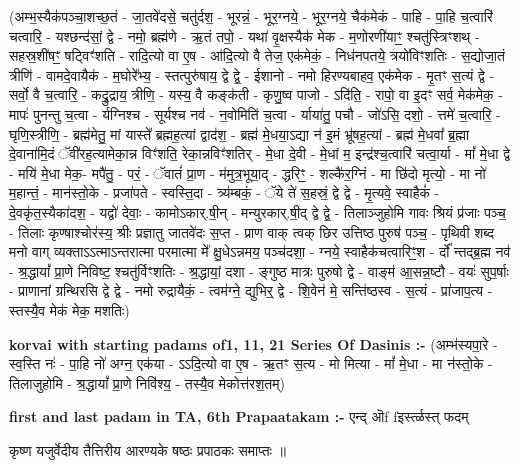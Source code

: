 \documentclass[17pt]{extarticle}
\begin{document}
(अम्भ॒स्यैक॑पञ्चा॒शच्छ॒तं - जा॒तवे॑दसे॒ चतु॑र्दश॒ - भूरन्नं॒ - भूर॒ग्नये॒ - भूर॒ग्नये॒ चैक॑मेकं - पाहि - पा॒हि च॒त्वारि॑ चत्वारि॒ - यश्छन्द॑सां॒ द्वे - नमो॒ ब्रह्म॑णे - ऋ॒तं तपो॒ - यथा॑ वृ॒क्षस्यैक॑ मेक - म॒णोरणी॑याꣳ॒॒ श्चतु॑स्त्रिꣳशथ् - सहस्र॒शी॑षꣳ॒॒ षट्विꣳ॑शति - रादि॒त्यो वा ए॒ष - आ॑दि॒त्यो वै तेज॒ एक॑मेकं॒ - निध॑नपतये॒ त्रयो॑विꣳशतिः - स॒द्योजा॒तं त्रीणि॑ - वामदे॒वायैक॑ - म॒घोरे᳚भ्य॒ - स्तत्पुरु॑षाय॒ द्वे द्वे॒ - ईशानो - नमो हिरण्यबाहव॒ एक॑मेक - मृ॒तꣳ स॒त्यं द्वे - सर्वो॒ वै च॒त्वारि॒ - कद्रु॒द्राय॒ त्रीणि॒ - यस्य॒ वै कङ्क॑ती - कृणु॒ष्व पाजो - ऽदि॑ति॒ - रापो॒ वा इ॒दꣳ सर्व॒ मेक॑मेक॒ - मापः॑ पुनन्तु च॒त्वा - र्यग्निश्च - सूर्यश्च नव॑ - न॒वोमिति॑ च॒त्वा - र्याया॑तु॒ पचौ - जो॑ऽसि॒ दशो॒ - त्तमे॑ च॒त्वारि॒ - घृणि॒स्त्रीणि॒ - ब्रह्म॑मेतु॒ मां यास्ते᳚ ब्रह्मह॒त्यां द्वाद॑श॒ - ब्रह्म॑ मे॒धया॒ऽद्या न॑ इ॒मं भ्रू॑षह॒त्यां - ब्रह्म॑ मे॒धवा᳚ ब्र॒ह्मा दे॒वाना॑मि॒दं ॅवी॑रह॒त्यामेका॒न्न विꣳ॑शति॒ रेका॒न्नविꣳ॑शतिर् - मे॒धा दे॒वी - मे॒धां म॒ इन्द्र॑श्च॒त्वारि॑ चत्वा॒र्या - मां᳚ मे॒धा द्वे - मयि॑ मे॒धा मेक॒- मपै॑तु॒ - परं॒ - ॅवातं॑ प्रा॒ण - म॑मुत्र॒भूया॒द् - द्धरिꣳ॒॒ - शल्कै॑र॒ग्निं - मा छि॑दो मृत्यो॒ - मा नो॑ म॒हान्तं॒ - मान॑स्तो॒के - प्रजा॑पते - स्वस्ति॒दा - त्र्य॑म्बकं॒ - ॅये ते॑ स॒हस्रं॒ द्वे द्वे - मृ॒त्यवे॒ स्वाहैकं॑ - दे॒वकृ॑त॒स्यैका॑दश॒ - यद्वो॑ देवाः॒ - कामोऽकार्.षी॒न् - मन्युरकार्.षी॒द् द्वे द्वे॒ - तिलाञ्जुहोमि गावः श्रियं प्र॑जाः पञ्च॒ - तिलाः कृण्षाश्चोर॑स्य॒ श्रीः प्रज्ञातु जातवे॑दः स॒प्त - प्राण वाक् त्वक् छिर उत्तिष्ठ पुरुष॑ पञ्च॒ - पृथिवी शब्द मनो वाग् व्यक्ताऽऽत्माऽन्तरात्मा परमात्मा मे᳚ क्षु॒धेऽन्नमय॒ पञ्च॑दशा॒ - ग्नये॒ स्वाहैक॑चत्वारिꣳ॒॒श - र्दो᳚ न्तद्ब्र॒ह्म नव॑ - श्र॒द्धायां᳚ प्रा॒णे निविष्ट॒ श्चतु॑र्विꣳशतिः - श्र॒द्धायां॒ दशा - ङ्गुष्ठ मात्रः पुरुषो द्वे - वाङ्म॑ आ॒सन्न॒ष्टौ - वयः॑ सुप॒र्षाः - प्राणानां ग्रन्थिरसि द्वे द्वे - नमो रुद्रायैकं॒ - त्वम॑ग्ने॒ द्युभिर्॒ द्वे - शि॒वेन॑ मे॒ सन्ति॑ष्ठस्व - स॒त्यं - प्रा॑जाप॒त्य - स्तस्यै॒व मेक॑ मेक॒ मशतिः) \newline

\textbf{korvai with starting padams of1, 11, 21 Series Of Dasinis :-} \newline
(अम्भ॑स्यपा॒रे - स्व॒स्ति नः॑ - पा॒हि नो॑ अग्न॒ एक॑या - ऽऽदि॒त्यो वा ए॒ष - ऋ॒तꣳ स॒त्य - मो मित्या - मां᳚ मे॒धा - मा न॑स्तो॒के - तिलाजुहोमि - श्र॒द्धायां᳚ प्रा॒णे निवि॑श्य॒ - तस्यै॒व मेकोत्त॑रश॒तम्) \newline

\textbf{first and last padam in TA, 6th Prapaatakam :-} \newline
एन्द् ऒf fइर्स्त्ळस्त् फदम् \newline 


कृष्ण यजुर्वेदीय तैत्तिरीय आरण्यके षष्ठः प्रपाठकः समाप्तः ॥ \newline
\pagebreak
\pagebreak
        
\end{document}
